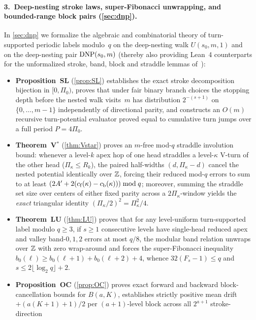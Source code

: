 \paragraph{3.\ Deep-nesting stroke laws, super-Fibonacci unwrapping, and bounded-range block pairs (\cref{sec:dnp}).}
In \cref{sec:dnp} we formalize the algebraic and combinatorial theory of turn-supported periodic labels modulo~$q$ on the
deep-nesting walk $U(s_0, m, 1)$ and on the deep-nesting pair $\mathrm{DNP}(s_0, m)$ (thereby also providing Lean~4
counterparts for the unformalized stroke, band, block and straddle lemmas of~\cite[Section~5]{EighthPaper2026}):
\begin{itemize}
\item \textbf{Proposition~SL} (\cref{prop:SL}) establishes the exact stroke decomposition bijection in $[0, \Pi_0)$,
  proves that under fair binary branch choices the stopping depth before the nested walk visits~$m$ has distribution
  $2^{-(s+1)}$ on $\{0,\dots,m-1\}$ independently of directional parity, and constructs an $O(m)$ recursive turn-potential
  evaluator  proved equal to cumulative turn jumps over a full period $P = 4 \Pi_0$.
\item \textbf{Theorem~V$^*$} (\cref{thm:Vstar}) proves an $m$-free mod-$q$ straddle involution bound: whenever a level-$k$
  apex hop of one head straddles a level-$\kappa$ V-turn of the other head ($\Pi_\kappa \le R_k$), the paired half-widths
  $(d, \Pi_\kappa - d)$ cancel the nested potential identically over $\mathbb{Z}$, forcing their reduced mod-$q$ errors to sum to
  at least $(2 A' + 2(c_{\mathrm{f}}(\kappa) - c_{\mathrm{b}}(\kappa))) \bmod q$; moreover, summing the straddle set size over
  centers of either fixed parity across a $2\Pi_\kappa$-window yields the \emph{exact} triangular identity
  $(\Pi_\kappa / 2)^2 = \Pi_\kappa^2 / 4$.
\item \textbf{Theorem~LU} (\cref{thm:LU}) proves that for any level-uniform turn-supported label modulo $q \ge 3$, if
  $s \ge 1$ consecutive levels have single-head reduced apex and valley band-$0,1,2$ errors at most $q/8$, the modular
  band relation unwraps over $\mathbb{Z}$ with zero wrap-around and forces the super-Fibonacci inequality
  $b_0(\ell) \ge b_0(\ell+1) + b_0(\ell+2) + 4$, whence $32(F_s - 1) \le q$ and $s \le 2\lfloor \log_2 q \rfloor + 2$.
\item \textbf{Proposition~OC} (\cref{prop:OC}) proves exact forward and backward block-cancellation bounds for $B(a, K)$,
  establishes strictly positive mean drift $+(a(K+1)+1)/2$ per $(a+1)$-level block across all $2^{a+1}$ stroke-direction

\end{itemize}
